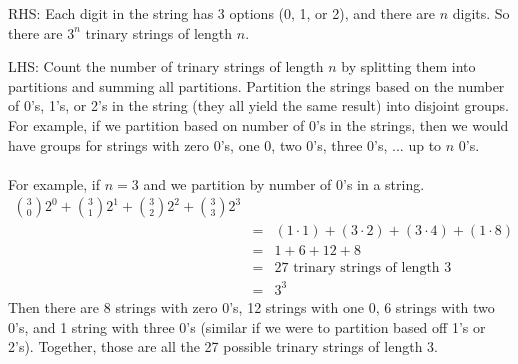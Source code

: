 \documentclass[10pt,a4paper,final]{article}
\begin{document}
\begin{enumerate}
RHS: Each digit in the string has 3 options (0, 1, or 2), and there are $n$ digits.
So there are $3^n$ trinary strings of length $n$.

LHS: Count the number of trinary strings of length $n$ by splitting them into partitions and
summing all partitions. Partition the strings based on the number of 0's, 1's, or 2's in the string
(they all yield the same result) into disjoint groups.
For example, if we partition based on number of 0's in the strings,
then we would have groups for strings with zero 0's, one 0, two 0's, three 0's, ... up to $n$ 0's.\\
\\
For example, if $n=3$ and we partition by number of 0's in a string.
\begin{eqnarray*}
\binom{3}{0}2^0 + \binom{3}{1}2^1 + \binom{3}{2}2^2 + \binom{3}{3}2^3\\
&=& (1 \cdot 1) + (3 \cdot 2) + (3 \cdot 4) + (1 \cdot 8)\\
&=& 1 + 6 + 12 + 8\\
&=& 27 \mbox{ trinary strings of length 3}\\
&=& 3^3
\end{eqnarray*}
Then there are 8 strings with zero 0's, 12 strings with one 0, 6 strings with two 0's, and 1 string
with three 0's (similar if we were to partition based off 1's or 2's).
Together, those are all the 27 possible trinary strings of length 3.

\end{enumerate}
\end{document}
